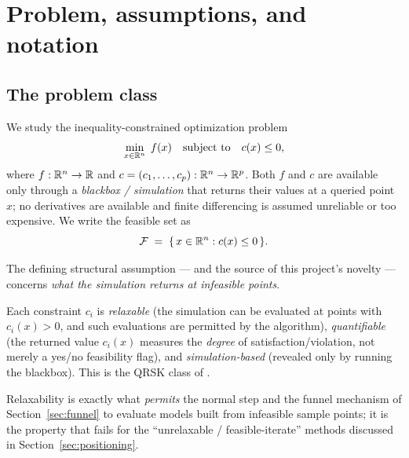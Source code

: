 \section{Problem, assumptions, and notation}
\label{sec:problem}

\subsection{The problem class}

We study the inequality-constrained optimization problem
\begin{equation}
  \label{eq:problem}
  \min_{x \in \mathbb{R}^{n}} \; f(x)
  \quad\text{subject to}\quad
  c(x) \le 0,
\end{equation}
where $f:\mathbb{R}^{n}\to\mathbb{R}$ and $c=(c_1,\dots,c_p):\mathbb{R}^{n}\to\mathbb{R}^p$. Both $f$ and $c$ are
available only through a \emph{blackbox / simulation} that returns their values
at a queried point $x$; no derivatives are available and finite differencing is
assumed unreliable or too expensive. We write the feasible set as
\begin{equation}
  \label{eq:feasset}
  \mathcal{F} \;=\; \{\, x\in\mathbb{R}^{n} : c(x)\le 0 \,\}.
\end{equation}

The defining structural assumption --- and the source of this project's novelty
--- concerns \emph{what the simulation returns at infeasible points}.

\begin{assumption}
  \label{ass:relaxable}
  Each constraint $c_i$ is
  \emph{relaxable} (the simulation can be evaluated at points with $c_i(x)>0$,
  and such evaluations are permitted by the algorithm),
  \emph{quantifiable} (the returned value $c_i(x)$ measures the \emph{degree} of
  satisfaction/violation, not merely a yes/no feasibility flag), and
  \emph{simulation-based} (revealed only by running the blackbox).
  This is the QRSK class of \citet{LeDigabelWild2015}.
\end{assumption}

Relaxability is exactly what \emph{permits} the normal step and the funnel
mechanism of Section~\ref{sec:funnel} to evaluate models built from infeasible
sample points; it is the property that fails for the ``unrelaxable /
feasible-iterate'' methods discussed in Section~\ref{sec:positioning}.

